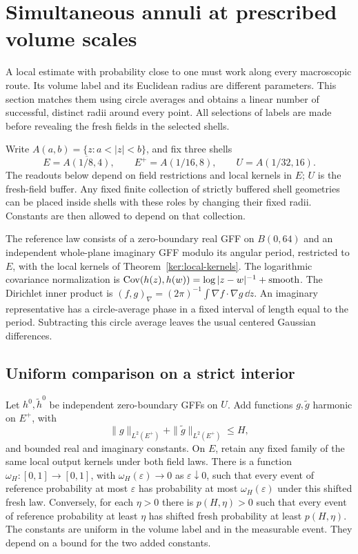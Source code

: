 \section{Simultaneous annuli at prescribed volume scales}
\label{ann:section}

A local estimate with probability close to one must work along every
macroscopic route.  Its volume label and its Euclidean radius are
different parameters.  This section matches them using circle averages
and obtains a linear number of successful, distinct radii around every
point.  All selections of labels are made before revealing the fresh
fields in the selected shells.

Write \(A(a,b)=\{z:a<|z|<b\}\), and fix three shells
\begin{equation}
 E=\overline{A(1/8,4)},\qquad E^+=A(1/16,8),\qquad
 U=A(1/32,16).
 \label{ann:shells}
\end{equation}
The readouts below depend on field restrictions and local kernels in
\(E\); \(U\) is the fresh-field buffer.  Any fixed finite collection of
strictly buffered shell geometries can be placed inside shells with
these roles by changing their fixed radii.  Constants are then allowed
to depend on that collection.

The reference law consists of a zero-boundary real GFF on \(B(0,64)\)
and an independent whole-plane imaginary GFF modulo its angular
period, restricted to \(E\), with the local kernels of
Theorem~\ref{ker:local-kernels}.  The logarithmic covariance
normalization is
\(\operatorname{Cov}(h(z),h(w))=\log|z-w|^{-1}+\text{smooth}\).
The Dirichlet inner product is
\((f,g)_\nabla=(2\pi)^{-1}\int\nabla f\cdot\nabla g\,\dd z\).
An imaginary representative has a circle-average phase in a fixed
interval of length equal to the period.  Subtracting this circle
average leaves the usual centered Gaussian differences.

\subsection{Uniform comparison on a strict interior}

\begin{lemma}\label{ann:conditional-transfer}
Let \(h^0,\widetilde h^0\) be independent zero-boundary GFFs on \(U\).
Add functions \(g,\widetilde g\) harmonic on \(E^+\), with
\[
 \|g\|_{L^2(E^+)}+\|\widetilde g\|_{L^2(E^+)}\le H,
\]
and bounded real and imaginary constants.  On \(E\), retain any fixed
family of the same local output kernels under both field laws.
There is a function \(\omega_H:[0,1]\to[0,1]\), with
\(\omega_H(\varepsilon)\to0\) as \(\varepsilon\downarrow0\), such that
every event of reference probability at most \(\varepsilon\) has
probability at most \(\omega_H(\varepsilon)\) under this shifted fresh
law.  Conversely, for each \(\eta>0\) there is \(p(H,\eta)>0\)
such that every event of reference probability at least \(\eta\) has
shifted fresh probability at least \(p(H,\eta)\).
The constants are uniform in the volume label and in the measurable
event.  They depend on a bound for the two added constants.
\end{lemma}

